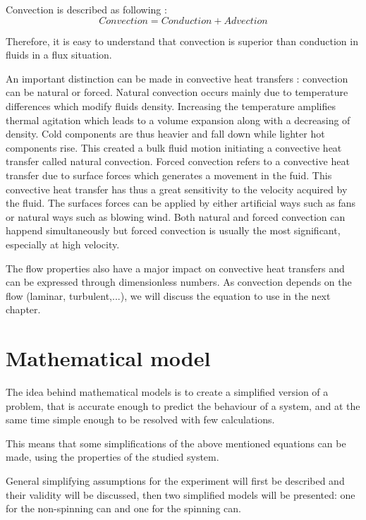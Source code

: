 \documentclass{report}
\begin{document}
	Convection is described as following :
	\begin{equation}
		Convection = Conduction + Advection
	\end{equation}
	
	Therefore, it is easy to understand that convection is superior than conduction in fluids in a flux situation. 
	
	An important distinction can be made in convective heat transfers : convection can be natural or forced.
	Natural convection occurs mainly due to temperature differences which modify fluids density. Increasing the temperature amplifies thermal agitation which leads to a volume expansion along with a decreasing of density. Cold components are thus heavier and fall down while lighter hot components rise. This created a bulk fluid motion initiating a convective heat transfer called natural convection.
	Forced convection refers to a convective heat transfer due to surface forces which generates a movement in the fuid. This convective heat transfer has thus a great sensitivity to the velocity acquired by the fluid. The surfaces forces can be applied by either artificial ways such as fans or natural ways such as blowing wind. 
	Both natural and forced convection can happend simultaneously but forced convection is usually the most significant, especially at high velocity.
	
	The flow properties also have a major impact on convective heat transfers and can be expressed through dimensionless numbers.
	As convection depends on the flow (laminar, turbulent,...), we will discuss the equation to use in the next chapter.
	
	\chapter{Mathematical model}\label{mm}
	
	The idea behind mathematical models is to create a simplified version of a problem, that is accurate enough to predict the behaviour of a system, and at the same time simple enough to be resolved with few calculations.
	
	This means that some simplifications of the above mentioned equations can be made, using the properties of the studied system.
	
	General simplifying assumptions for the experiment will first be described and their validity will be discussed, then two simplified models will be presented: one for the non-spinning can and one for the spinning can.
	
\end{document}
